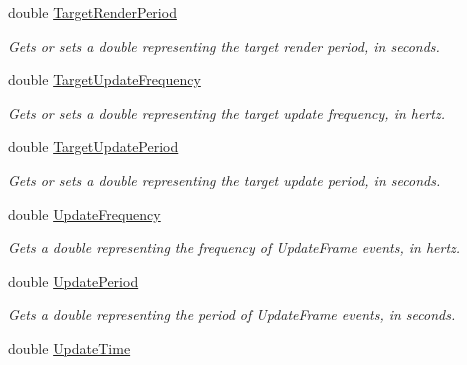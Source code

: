 \begin{DoxyCompactItemize}
double \hyperlink{class_open_t_k_1_1_game_window_a2233cfb62a42200251dcdb1dab643a36}{Target\-Render\-Period}
\begin{DoxyCompactList}\small\item\em Gets or sets a double representing the target render period, in seconds. \end{DoxyCompactList}\item 
double \hyperlink{class_open_t_k_1_1_game_window_acf250353ae71ed429642335d614da7c5}{Target\-Update\-Frequency}
\begin{DoxyCompactList}\small\item\em Gets or sets a double representing the target update frequency, in hertz. \end{DoxyCompactList}\item 
double \hyperlink{class_open_t_k_1_1_game_window_a3fb751962cfcd5c95ad4b9fb84f40dbb}{Target\-Update\-Period}
\begin{DoxyCompactList}\small\item\em Gets or sets a double representing the target update period, in seconds. \end{DoxyCompactList}\item 
double \hyperlink{class_open_t_k_1_1_game_window_aeee75eb97d0c305788b802a09fac3540}{Update\-Frequency}
\begin{DoxyCompactList}\small\item\em Gets a double representing the frequency of Update\-Frame events, in hertz. \end{DoxyCompactList}\item 
double \hyperlink{class_open_t_k_1_1_game_window_a1a44982a760d216e014c79dbf472f779}{Update\-Period}
\begin{DoxyCompactList}\small\item\em Gets a double representing the period of Update\-Frame events, in seconds. \end{DoxyCompactList}\item 
double \hyperlink{class_open_t_k_1_1_game_window_a324f362ab849612bb7a82ac84de92be0}{Update\-Time}

\end{DoxyCompactItemize}
